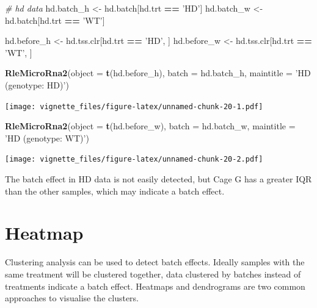 \documentclass[]{book}
\newenvironment{Shaded}{\begin{snugshade}}{\end{snugshade}}
\newcommand{\KeywordTok}[1]{\textcolor[rgb]{0.13,0.29,0.53}{\textbf{#1}}}
\newcommand{\DataTypeTok}[1]{\textcolor[rgb]{0.13,0.29,0.53}{#1}}
\newcommand{\StringTok}[1]{\textcolor[rgb]{0.31,0.60,0.02}{#1}}
\newcommand{\CommentTok}[1]{\textcolor[rgb]{0.56,0.35,0.01}{\textit{#1}}}
\newcommand{\OperatorTok}[1]{\textcolor[rgb]{0.81,0.36,0.00}{\textbf{#1}}}
\newcommand{\NormalTok}[1]{#1}
\begin{document}
\begin{Shaded}
\begin{Highlighting}[]
\CommentTok{# hd data}
\NormalTok{hd.batch_h <-}\StringTok{ }\NormalTok{hd.batch[hd.trt }\OperatorTok{==}\StringTok{ 'HD'}\NormalTok{]}
\NormalTok{hd.batch_w <-}\StringTok{ }\NormalTok{hd.batch[hd.trt }\OperatorTok{==}\StringTok{ 'WT'}\NormalTok{] }

\NormalTok{hd.before_h <-}\StringTok{ }\NormalTok{hd.tss.clr[hd.trt }\OperatorTok{==}\StringTok{ 'HD'}\NormalTok{, ]}
\NormalTok{hd.before_w <-}\StringTok{ }\NormalTok{hd.tss.clr[hd.trt }\OperatorTok{==}\StringTok{ 'WT'}\NormalTok{, ]}

\KeywordTok{RleMicroRna2}\NormalTok{(}\DataTypeTok{object =} \KeywordTok{t}\NormalTok{(hd.before_h), }\DataTypeTok{batch =}\NormalTok{ hd.batch_h, }
             \DataTypeTok{maintitle =} \StringTok{'HD (genotype: HD)'}\NormalTok{)}
\end{Highlighting}
\end{Shaded}

\texttt{[image: vignette\_files/figure-latex/unnamed-chunk-20-1.pdf]}

\begin{Shaded}
\begin{Highlighting}[]
\KeywordTok{RleMicroRna2}\NormalTok{(}\DataTypeTok{object =} \KeywordTok{t}\NormalTok{(hd.before_w), }\DataTypeTok{batch =}\NormalTok{ hd.batch_w, }
             \DataTypeTok{maintitle =} \StringTok{'HD (genotype: WT)'}\NormalTok{)}
\end{Highlighting}
\end{Shaded}

\texttt{[image: vignette\_files/figure-latex/unnamed-chunk-20-2.pdf]}

The batch effect in HD data is not easily detected, but Cage G has a
greater IQR than the other samples, which may indicate a batch effect.

\section{Heatmap}\label{heatmap}

Clustering analysis can be used to detect batch effects. Ideally samples
with the same treatment will be clustered together, data clustered by
batches instead of treatments indicate a batch effect. Heatmaps and
dendrograms are two common approaches to visualise the clusters.
\end{document}

